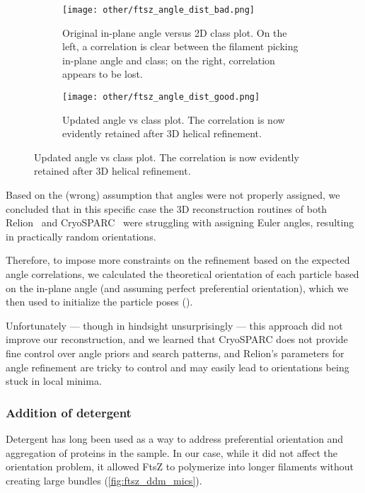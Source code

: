 \begin{figure}[ht]
    \centering
    \begin{subfigure}[B]{\textwidth}
        \centering
        \texttt{[image: other/ftsz\_angle\_dist\_bad.png]}
        \caption{Original in-plane angle versus 2D class plot. On the left, a correlation is clear between the filament picking in-plane angle and class; on the right, correlation appears to be lost.}
        \label{fig:ftsz_filament_angles_bad}
    \end{subfigure}
    \begin{subfigure}[B]{\textwidth}
        \centering
        \texttt{[image: other/ftsz\_angle\_dist\_good.png]}
        \caption{Updated angle vs class plot. The correlation is now evidently retained after 3D helical refinement.}
        \label{fig:ftsz_filament_angles_good}
    \end{subfigure}%
    \label{fig:ftsz_filament_angles}
\end{figure}

Based on the (wrong) assumption that angles were not properly assigned, we concluded that in this specific case the 3D reconstruction routines of both Relion~\cite{scheresRELIONImplementationBayesian2012} and CryoSPARC~\cite{punjaniCryoSPARCAlgorithmsRapid2017} were struggling with assigning Euler angles, resulting in practically random orientations.

Therefore, to impose more constraints on the refinement based on the expected angle correlations, we calculated the theoretical orientation of each particle based on the in-plane angle (and assuming perfect preferential orientation), which we then used to initialize the particle poses ().

Unfortunately --- though in hindsight unsurprisingly --- this approach did not improve our reconstruction, and we learned that CryoSPARC does not provide fine control over angle priors and search patterns, and Relion's parameters for angle refinement are tricky to control and may easily lead to orientations being stuck in local minima.

\subsubsection{Addition of detergent}
Detergent has long been used as a way to address preferential orientation and aggregation of proteins in the sample.
In our case, while it did not affect the orientation problem, it allowed FtsZ to polymerize into longer filaments without creating large bundles (\autoref{fig:ftsz_ddm_mics}).

